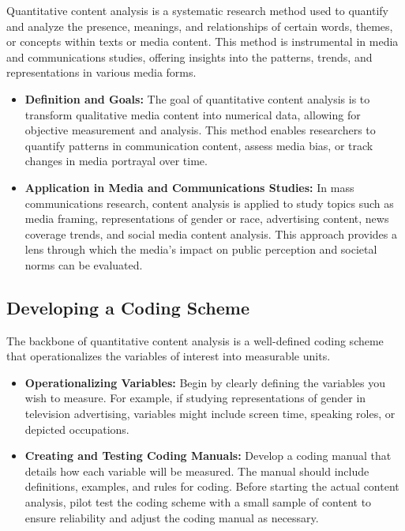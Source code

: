 \documentclass[
]{book}
\begin{document}
Quantitative content analysis is a systematic research method used to quantify and analyze the presence, meanings, and relationships of certain words, themes, or concepts within texts or media content. This method is instrumental in media and communications studies, offering insights into the patterns, trends, and representations in various media forms.

\begin{itemize}
\item
  \textbf{Definition and Goals:} The goal of quantitative content analysis is to transform qualitative media content into numerical data, allowing for objective measurement and analysis. This method enables researchers to quantify patterns in communication content, assess media bias, or track changes in media portrayal over time.
\item
  \textbf{Application in Media and Communications Studies:} In mass communications research, content analysis is applied to study topics such as media framing, representations of gender or race, advertising content, news coverage trends, and social media content analysis. This approach provides a lens through which the media's impact on public perception and societal norms can be evaluated.
\end{itemize}

\hypertarget{developing-a-coding-scheme}{%
\subsection*{Developing a Coding Scheme}\label{developing-a-coding-scheme}}

The backbone of quantitative content analysis is a well-defined coding scheme that operationalizes the variables of interest into measurable units.

\begin{itemize}
\item
  \textbf{Operationalizing Variables:} Begin by clearly defining the variables you wish to measure. For example, if studying representations of gender in television advertising, variables might include screen time, speaking roles, or depicted occupations.
\item
  \textbf{Creating and Testing Coding Manuals:} Develop a coding manual that details how each variable will be measured. The manual should include definitions, examples, and rules for coding. Before starting the actual content analysis, pilot test the coding scheme with a small sample of content to ensure reliability and adjust the coding manual as necessary.
\end{itemize}
\end{document}
